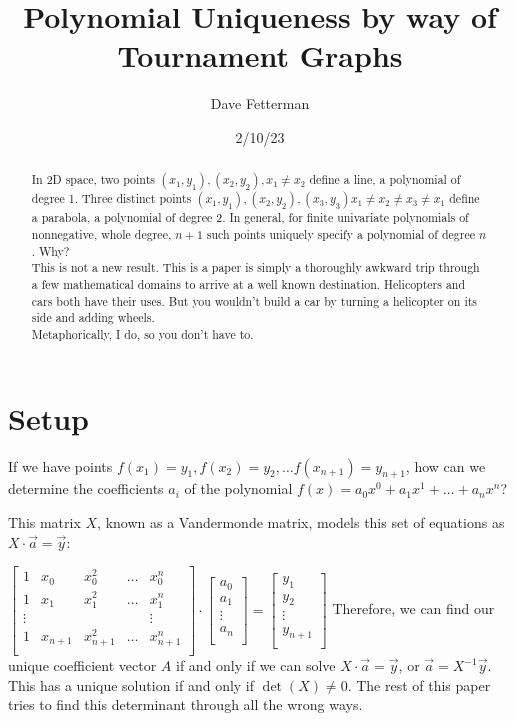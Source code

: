\documentclass[11pt, oneside]{article} 	%
\title{Polynomial Uniqueness by way of Tournament Graphs}
\author{Dave Fetterman}
\affil{Obviously Unemployed}
\date{2/10/23}
\begin{document}
\maketitle

\begin{abstract}

In 2D space, two points $(x_1, y_1), (x_2, y_2), x_1 \neq x_2$ define a line, a polynomial of degree 1.  Three distinct points $(x_1, y_1), (x_2, y_2), (x_3, y_3) x_1 \neq x_2 \neq x_3 \neq x_1$ define a parabola, a polynomial of degree 2.  In general, for finite univariate polynomials of nonnegative, whole degree, $n+1$ such points uniquely specify a polynomial of degree $n$.  Why?
\\

This is not a new result. This is a paper is simply a thoroughly awkward trip through a few mathematical domains to arrive at a well known destination. Helicopters and cars both have their uses. But you wouldn't build a car by turning a helicopter on its side and adding wheels.  
\\

Metaphorically, I do, so you don't have to.

\end{abstract}

\section{Setup}

If we have points $f(x_1) = y_1, f(x_2) = y_2, \ldots f(x_{n+1}) = y_{n+1}$, how can we determine the coefficients $a_i$ of the polynomial $f(x) = a_0x^0 + a_1x^1 + \ldots + a_nx^n$?

This matrix $X$, known as a Vandermonde matrix\cite{1}, models this set of equations as $X \cdot \vec{a} = \vec{y}$:

 $\begin{bmatrix}
1 & x_0 & x_0^2 & \ldots & x_0^{n} \\
1 & x_1 & x_1^2 & \ldots & x_1^{n} \\
\vdots & & & & \vdots  \\
1 & x_{n+1} & x_{n+1}^2 & \ldots & x_{n+1}^{n} \\
\end{bmatrix}
\cdot 
\begin{bmatrix}
a_0 \\
a_1 \\
\vdots \\
a_n \\
\end{bmatrix}
=
\begin{bmatrix}
y_1 \\
y_2 \\
\vdots \\
y_{n+1} \\
\end{bmatrix}
$
Therefore, we can find our unique coefficient vector $A$ if and only if we can solve $X \cdot \vec{a} = \vec{y}$, or $\vec{a} = X^{-1} \vec{y}$.  This has a unique solution if and only if $\det(X) \neq 0$.  The rest of this paper tries to find this determinant through all the wrong ways.
\end{document}
